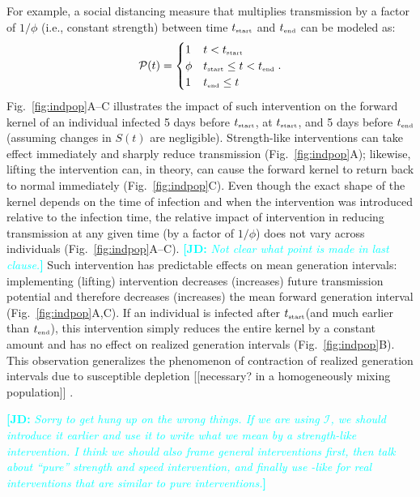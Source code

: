 \documentclass[12pt]{article}
\newcommand{\comment}{\showcomment}
\newcommand{\showcomment}[3]{\textcolor{#1}{\textbf{[#2: }\textsl{#3}\textbf{]}}}
\newcommand{\jd}[1]{\comment{cyan}{JD}{#1}}
\newcommand{\fref}[1]{Fig.~\ref{fig:#1}}
\newcommand{\tsub}[2]{#1_{{\textrm{\tiny #2}}}}
\newcommand{\tstart}{\ensuremath{\tsub{t}{start}}\xspace}
\newcommand{\tend}{\ensuremath{\tsub{t}{end}}\xspace}
\newcommand{\PP}{{\mathcal P}}
\newcommand{\II}{\ensuremath{\mathcal I}}
\begin{document}
For example, a social distancing measure that multiplies transmission by a factor of $1/\phi$ (i.e., constant strength) between time \tstart and \tend can be modeled as:
\begin{equation}
\PP(t) = \begin{cases}
1 & t < \tstart\\
\phi & \tstart \leq t < \tend\\
1 & \tend \leq t
\end{cases}.
\end{equation}
\fref{indpop}A--C illustrates the impact of such intervention on the forward kernel of an individual infected 5 days before $\tstart$, at $\tstart$, and 5 days before $\tend$ (assuming changes in $S(t)$ are negligible).
Strength-like interventions can take effect immediately and sharply reduce transmission (\fref{indpop}A);
likewise, lifting the intervention can, in theory, can cause the forward kernel to return back to normal immediately (\fref{indpop}C).
Even though the exact shape of the kernel depends on the time of infection and when the intervention was introduced relative to the infection time, the relative impact of intervention in reducing transmission at any given time (by a factor of $1/\phi$) does not vary across individuals (\fref{indpop}A--C). \jd{Not clear what point is made in last clause.}
Such intervention has predictable effects on mean generation intervals:
implementing (lifting) intervention decreases (increases) future transmission potential and therefore decreases (increases) the mean forward generation interval (\fref{indpop}A,C).
If an individual is infected after \tstart (and much earlier than \tend), this intervention simply reduces the entire kernel by a constant amount and has no effect on realized generation intervals (\fref{indpop}B).
This observation generalizes the phenomenon of contraction of realized generation intervals due to susceptible depletion [[necessary? in a homogeneously mixing population]] \citep{kenah2008generation,nishiura2010time,champredon2015intrinsic}. 

\jd{Sorry to get hung up on the wrong things. If we are using \II, we should introduce it earlier and use it to write what we mean by a strength-like intervention. I think we should also frame general interventions first, then talk about ``pure'' strength and speed intervention, and finally use -like for real interventions that are similar to pure interventions.}
\end{document}
